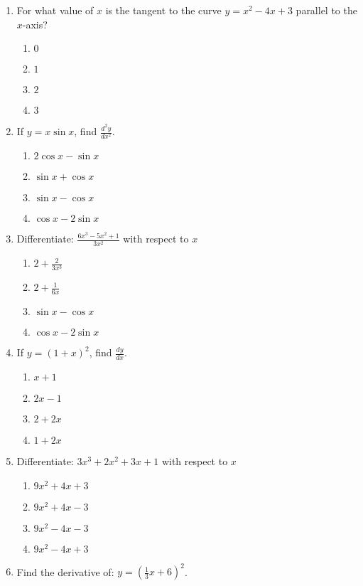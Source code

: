 \begin{enumerate}[label={\arabic*.}]
\item For what value of \(x\) is the tangent to the curve \(y = x^{2} - 4x + 3\) parallel to the \(x\)-axis?
    \begin{enumerate}[label={\Alph*.}]
        \item \(0\)
        \item \(1\)
        \item \(2\)
        \item \(3\)
    \end{enumerate}   
\item If \(y = x \sin x\), find \( \frac{d^2y}{dx^2} \).
	\begin{enumerate}[label={\Alph*.}]
	\item \(2\cos x - \sin x\)
	\item \(\sin x + \cos x\)
	\item \(\sin x  - \cos  x\)
	\item \( \cos x  - 2\sin x \)
	\end{enumerate}
\item Differentiate: \(\frac{6x^{3} - 5x^{2} + 1}{3x^{2}}\) with respect to \(x\)
	\begin{enumerate}[label={\Alph*.}]
	\item \(2 + \frac{2}{3{x}^{3}}\)
	\item \(2 + \frac{1}{6x}\)
	\item \(\sin x - \cos x\)
	\item \(\cos x - 2\sin x\)
	\end{enumerate}
\item If \(y = (1+x)^{2}\), find \( \frac{dy}{dx} \).
	\begin{enumerate}[label={\Alph*.}]
	\item \(x+1\)
	\item \(2x-1\)
	\item \(2 + 2x\)
	\item \(1+2x\)
	\end{enumerate}
\item Differentiate: \(3x^3+2x^2+3x+1\) with respect to \(x\)
	\begin{enumerate}[label={\Alph*.}]
	\item \(9x^2+4x+3\)
	\item \(9x^2+4x-3\)
	\item \(9x^2-4x-3\)
	\item \(9x^2-4x+3\)
	\end{enumerate}
\item Find the derivative of: \(y=(\frac{1}{3}x + 6)^{2}\).
	\begin{enumerate}[label={\Alph*.}]

\end{enumerate}
\end{enumerate}
